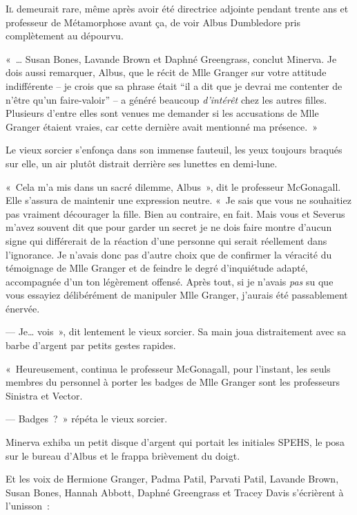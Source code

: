 
\lettrine{I}{l} demeurait rare, même après avoir été directrice adjointe pendant trente ans et professeur de Métamorphose avant ça, de voir Albus Dumbledore pris complètement au dépourvu.

«~… Susan Bones, Lavande Brown et Daphné Greengrass, conclut Minerva. Je dois aussi remarquer, Albus, que le récit de Mlle Granger sur votre attitude indifférente -- je crois que sa phrase était “il a dit que je devrai me contenter de n'être qu'un faire-valoir” -- a généré beaucoup \emph{d'intérêt} chez les autres filles. Plusieurs d'entre elles sont venues me demander si les accusations de Mlle Granger étaient vraies, car cette dernière avait mentionné ma présence.~»

Le vieux sorcier s'enfonça dans son immense fauteuil, les yeux toujours braqués sur elle, un air plutôt distrait derrière ses lunettes en demi-lune.

«~Cela m'a mis dans un sacré dilemme, Albus~», dit le professeur McGonagall. Elle s'assura de maintenir une expression neutre. «~Je sais que vous ne souhaitiez pas vraiment décourager la fille. Bien au contraire, en fait. Mais vous et Severus m'avez souvent dit que pour garder un secret je ne dois faire montre d'aucun signe qui différerait de la réaction d'une personne qui serait réellement dans l'ignorance. Je n'avais donc pas d'autre choix que de confirmer la véracité du témoignage de Mlle Granger et de feindre le degré d'inquiétude adapté, accompagnée d'un ton légèrement offensé. Après tout, si je n'avais \emph{pas} su que vous essayiez délibérément de manipuler Mlle Granger, j'aurais été passablement énervée.

--- Je… vois~», dit lentement le vieux sorcier. Sa main joua distraitement avec sa barbe d'argent par petits gestes rapides.

«~Heureusement, continua le professeur McGonagall, pour l'instant, les seuls membres du personnel à porter les badges de Mlle Granger sont les professeurs Sinistra et Vector.

--- Badges~?~» répéta le vieux sorcier.

Minerva exhiba un petit disque d'argent qui portait les initiales SPEHS, le posa sur le bureau d'Albus et le frappa brièvement du doigt.

Et les voix de Hermione Granger, Padma Patil, Parvati Patil, Lavande Brown, Susan Bones, Hannah Abbott, Daphné Greengrass et Tracey Davis s'écrièrent à l'unisson~:

